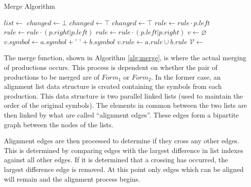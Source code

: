 \documentclass[10pt,nocc]{xrese_report}
\begin{document}
\begin{algorithm}[tb]
 \caption{Merge Algorithm}\label{alg:merge}
 \begin{algorithmic}[1]
      \State $list \gets$ 
          \State {}
        \EndIf
      \EndFor
      \Repeat
        \State $changed \gets \bot$
            \State {}
            \State $changed \gets \top$
            \State {}
            \State $changed \gets \top$
          \EndIf
        \EndFor
          \State $rule \gets rule \cdot p.left$
          \State $rule \gets rule \cdot (p.right | p.left)$
        \Else
          \State $rule \gets rule \cdot (p.left | p.right)$
        \EndIf
      \EndFor
    \Else
      \State $v \gets \varnothing$
      \State $v.symbol \gets a.symbol + \textrm{' '} + b.symbol$
      \State $v.rule \gets a.rule \cup b.rule$
    \EndIf
    \State $\mathcal{V} \gets$ 
    \State {}
  \EndFunction  
 \end{algorithmic}

\end{algorithm}

The merge function, shown in Algorithm \ref{alg:merge}, is where the actual merging of productions occurs. This process is dependent on whether the pair of productions to be merged are of $Form_1$ or $Form_2$. In the former case, an alignment list data structure is created containing the symbols from each production. This data structure is two parallel linked lists (used to maintain the order of the original symbols). The elements in common between the two lists are then linked by what are called ``alignment edges''. These edges form a bipartite graph between the nodes of the lists.

Alignment edges are then processed to determine if they cross any other edges. This is determined by comparing edges with the largest difference in list indexes against all other edges. If it is determined that a crossing has occurred, the largest difference edge is removed. At this point only edges which can be aligned will remain and the alignment process begins.
\end{document}
